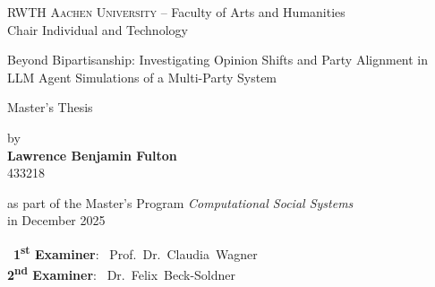 

\begin{titlepage}
  \begin{center}

    {\large
      \textsc{RWTH Aachen University} -- Faculty of Arts and Humanities\\
      Chair Individual and Technology
    }

    \vspace{3.2 cm}

    \hrulefill\par
    { 
      \huge
      Beyond Bipartisanship: Investigating Opinion Shifts and Party Alignment in LLM Agent Simulations of a Multi-Party System\\
    }
    \par\medskip\hrulefill\par

    \vspace{2.1 cm}

    {\huge
      Master's Thesis
    }

    \vspace{1.5 cm}

    {\Large by\\[2.3ex]
      {\bf Lawrence Benjamin Fulton}\\[2.3ex]
      433218
    }
    
    \vspace{1.7 cm}

    {\large as part of the Master's Program \textit{Computational Social Systems}}\\[2.3ex]    
    {\large in December 2025}

    \vfill

    \parbox{10cm}{%
      ~\textbf{1\textsuperscript{st} Examiner}: ~Prof.~Dr.~Claudia~Wagner\\
      \textbf{2\textsuperscript{nd} Examiner}: ~Dr.~Felix~Beck-Soldner\\
    }
    
  \end{center}
\end{titlepage}
